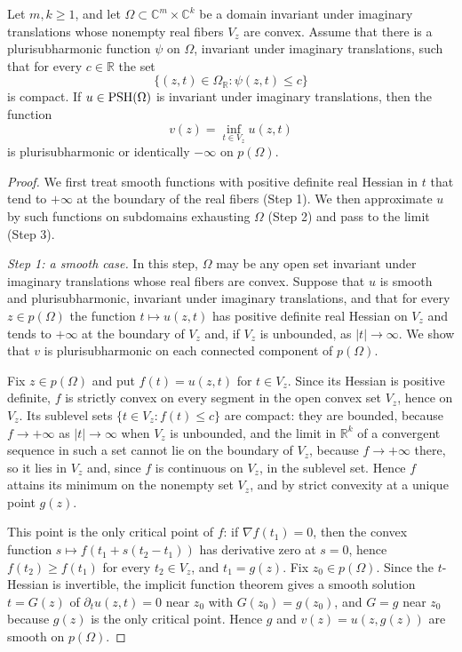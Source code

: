 \begin{theorem}\label{thm:kiselman-invariant-exhaustion}
Let $m,k\ge1$, and let $\Omega\subset\mathbb{C}^m\times\mathbb{C}^k$ be a domain invariant under imaginary translations whose nonempty real fibers $V_z$ are convex. Assume that there is a plurisubharmonic function $\psi$ on $\Omega$, invariant under imaginary translations, such that for every $c\in\mathbb R$ the set
\[
 \{(z,t)\in\Omega_{\mathbb R}:\psi(z,t)\le c\}
\]
is compact. If $u\in\mathrm{PSH}(\Omega)$ is invariant under imaginary translations, then the function
\[
 v(z)=\inf_{t\in V_z}u(z,t)
\]
is plurisubharmonic or identically $-\infty$ on $p(\Omega)$.
\end{theorem}
\begin{proof}
We first treat smooth functions with positive definite real Hessian in $t$ that tend to $+\infty$ at the boundary of the real fibers (Step 1). We then approximate $u$ by such functions on subdomains exhausting $\Omega$ (Step 2) and pass to the limit (Step 3).

\emph{Step 1: a smooth case.} In this step, $\Omega$ may be any open set invariant under imaginary translations whose real fibers are convex. Suppose that $u$ is smooth and plurisubharmonic, invariant under imaginary translations, and that for every $z\in p(\Omega)$ the function $t\mapsto u(z,t)$ has positive definite real Hessian on $V_z$ and tends to $+\infty$ at the boundary of $V_z$ and, if $V_z$ is unbounded, as $|t|\to\infty$. We show that $v$ is plurisubharmonic on each connected component of $p(\Omega)$.

Fix $z\in p(\Omega)$ and put $f(t)=u(z,t)$ for $t\in V_z$. Since its Hessian is positive definite, $f$ is strictly convex on every segment in the open convex set $V_z$, hence on $V_z$. Its sublevel sets $\{t\in V_z:f(t)\leq c\}$ are compact: they are bounded, because $f\to+\infty$ as $|t|\to\infty$ when $V_z$ is unbounded, and the limit in $\mathbb R^k$ of a convergent sequence in such a set cannot lie on the boundary of $V_z$, because $f\to+\infty$ there, so it lies in $V_z$ and, since $f$ is continuous on $V_z$, in the sublevel set. Hence $f$ attains its minimum on the nonempty set $V_z$, and by strict convexity at a unique point $g(z)$.

This point is the only critical point of $f$: if $\nabla f(t_1)=0$, then the convex function $s\mapsto f(t_1+s(t_2-t_1))$ has derivative zero at $s=0$, hence $f(t_2)\geq f(t_1)$ for every $t_2\in V_z$, and $t_1=g(z)$. Fix $z_0\in p(\Omega)$. Since the $t$-Hessian is invertible, the implicit function theorem gives a smooth solution $t=G(z)$ of $\partial_tu(z,t)=0$ near $z_0$ with $G(z_0)=g(z_0)$, and $G=g$ near $z_0$ because $g(z)$ is the only critical point. Hence $g$ and $v(z)=u(z,g(z))$ are smooth on $p(\Omega)$.


\end{proof}
